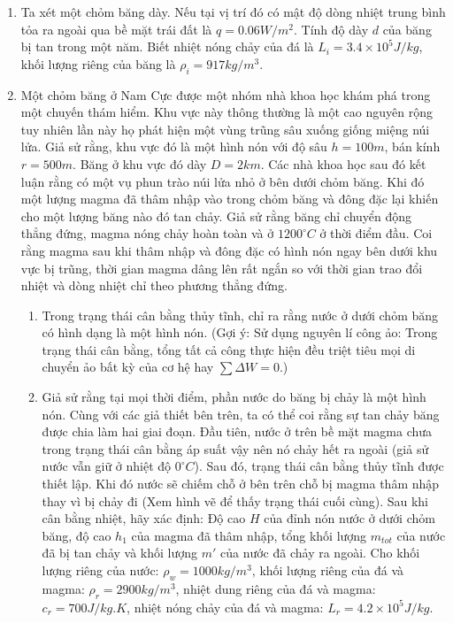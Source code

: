 \begin{enumerate}[label=(\alph*)]
\item Ta xét một chỏm băng dày. Nếu tại vị trí đó có mật độ dòng nhiệt trung bình tỏa ra ngoài qua bề mặt trái đất là $q = 0.06 \si{W/m^2}$. Tính độ dày $d$ của băng bị tan trong một năm. Biết nhiệt nóng chảy của đá là $L_i =3.4 \times 10^ 5\si{J/kg}$, khối lượng riêng của băng là $\rho_i = 917\si{kg/m^3}$.

\item  Một chỏm băng ở Nam Cực được một nhóm nhà khoa học khám phá trong một chuyến thám hiểm. Khu vực này thông thường là một cao nguyên rộng tuy nhiên lần này họ phát hiện một vùng trũng sâu xuống giống miệng núi lửa. Giả sử rằng, khu vực đó là một hình nón với độ sâu $h = 100\si{m}$, bán kính $r = 500\si{m}$. Băng ở khu vực đó dày $D=2\si{km}$.
Các nhà khoa học sau đó kết luận rằng có một vụ phun trào núi lửa nhỏ ở bên dưới chỏm băng. Khi đó một lượng magma đã thâm nhập vào trong chỏm băng và đông đặc lại khiến cho một lượng băng nào đó tan chảy. Giả sử rằng băng chỉ chuyển động thẳng đứng, magma nóng chảy hoàn toàn và ở $1200 ^{\circ} C$ ở thời điểm đầu. Coi rằng magma sau khi thâm nhập và đông đặc có hình nón ngay bên dưới khu vực bị trũng, thời gian magma dâng lên rất ngắn so với thời gian trao đổi nhiệt và dòng nhiệt chỉ theo phương thẳng đứng.
    \begin{enumerate}[label=(\roman*)]
    \item Trong trạng thái cân bằng thủy tĩnh, chỉ ra rằng nước ở dưới chỏm băng có hình dạng là một hình nón. (Gợi ý: Sử dụng nguyên lí công ảo: Trong trạng thái cân bằng, tổng tất cả công thực hiện đều triệt tiêu mọi di chuyển ảo bất kỳ của cơ hệ hay $\sum \Delta W=0$.)
    \item Giả sử rằng tại mọi thời điểm, phần nước do băng bị chảy là một hình nón. Cùng với các giả thiết bên trên, ta có thể coi rằng sự tan chảy băng được chia làm hai giai đoạn. Đầu tiên, nước ở trên bề mặt magma chưa trong trạng thái cân bằng áp suất vậy nên nó chảy hết ra ngoài (giả sử nước vẫn giữ ở nhiệt độ $0 ^{\circ} C$). Sau đó, trạng thái cân bằng thủy tĩnh được thiết lập. Khi đó nước sẽ chiếm chỗ ở bên trên chỗ bị magma thâm nhập thay vì bị chảy đi (Xem hình vẽ để thấy trạng thái cuối cùng). Sau khi cân bằng nhiệt, hãy xác định: Độ cao $H$ của đỉnh nón nước ở dưới chỏm băng, độ cao $h_1$ của magma đã thâm nhập, tổng khối lượng $m_{tot}$ của nước đã bị tan chảy và khối lượng $m'$ của nước đã chảy ra ngoài. Cho khối lượng riêng của nước: $\rho_w = 1000 \si{kg/m^3}$, khối lượng riêng của đá và magma: $\rho_r = 2900 \si{kg/m^3}$, nhiệt dung riêng của đá và magma: $c_r = 700\si{J/kg.K}$, nhiệt nóng chảy của đá và magma: $L_r = 4.2\times10^5 \si{J/kg}$.
    \end{enumerate}
\begin{figure}[H]
\centering   



\end{figure}
\end{enumerate}
